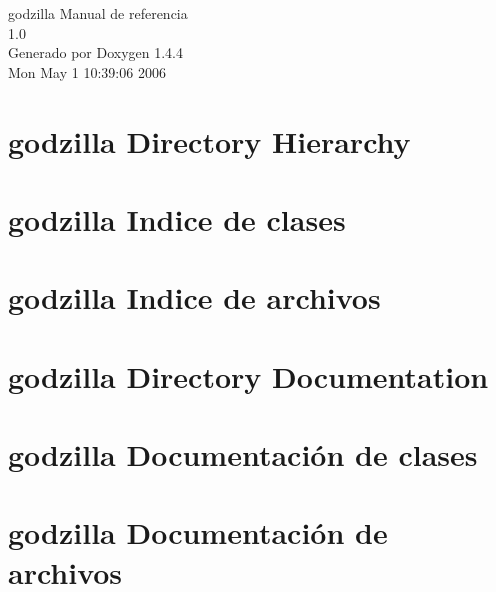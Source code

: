 \documentclass[a4paper]{book}
\begin{document}
\begin{titlepage}
\vspace*{7cm}
\begin{center}
{\Large godzilla Manual de referencia\\[1ex]\large 1.0 }\\
\vspace*{1cm}
{\large Generado por Doxygen 1.4.4}\\
\vspace*{0.5cm}
{\small Mon May 1 10:39:06 2006}\\
\end{center}
\end{titlepage}
\clearemptydoublepage
{}
\tableofcontents
\clearemptydoublepage
{}
\chapter{godzilla Directory Hierarchy}

\chapter{godzilla Indice de clases}

\chapter{godzilla Indice de archivos}

\chapter{godzilla Directory Documentation}








\chapter{godzilla Documentaci\'{o}n de clases}






















\chapter{godzilla Documentaci\'{o}n de archivos}













\printindex
\end{document}
